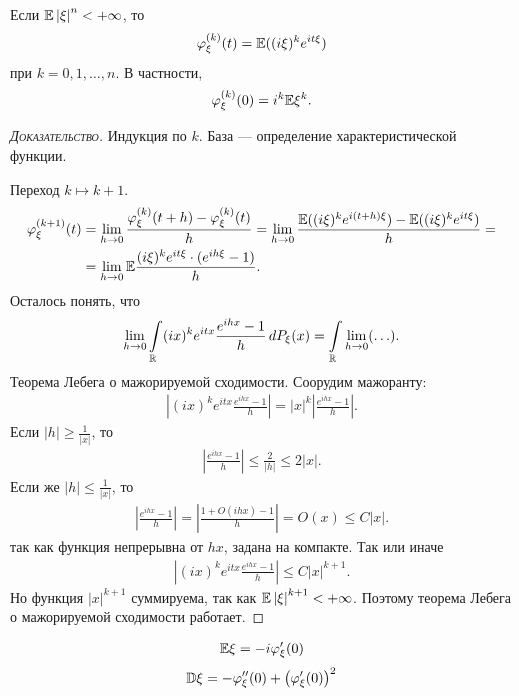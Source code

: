 \documentclass[../main.tex]{subfiles}
\begin{document}
\begin{thm}
 Если $ \mathbb E \left| \xi \right|^{n} < +\infty $, то
 \begin{align*}
  \varphi_\xi^{(k)}(t) = \mathbb E((i\xi)^{k}e^{it\xi})
 \end{align*} при $ k = 0, 1, \ldots, n $. В частности,
 \begin{align*}
  \varphi_\xi^{(k)}(0) = i^{k} \mathbb E\xi^{k}.
 \end{align*}
\end{thm}
\begin{proof}[\normalfont\textsc{Доказательство}]
 Индукция по $ k $. База --- определение характеристической функции.

 Переход $ k \mapsto k + 1 $.
 \begin{align*}
  \varphi_\xi^{(k+1)}(t) &= \lim_{h \to 0} \frac{\varphi_\xi^{(k)}(t+h) - \varphi_\xi^{(k)}(t)}{h} = \lim_{h \to 0} \frac{\mathbb E((i\xi)^{k}e^{i(t+h)\xi}) - \mathbb E((i\xi)^{k}e^{it\xi})}{h} = \\
  &= \lim_{h \to 0} \mathbb E \frac{(i\xi)^{k}e^{it\xi} \cdot (e^{ih\xi} - 1)}{h}.
 \end{align*} Осталось понять, что
 \begin{align*}
  \lim_{h \to 0} \int\limits_{\mathbb{R}} (ix)^{k}e^{itx} \frac{e^{ihx} - 1}{h}\,dP_\xi(x) = \int\limits_{\mathbb{R}} \lim_{h \to 0} (\ldots).
 \end{align*} Теорема Лебега о мажорируемой сходимости. Соорудим мажоранту:
 \begin{align*}
  \left| (ix)^{k}e^{itx}\frac{e^{ihx}-1}{h} \right| = \left| x \right|^{k} \left| \frac{e^{ihx}-1}{h} \right|.
 \end{align*} Если $ \left| h \right| \geqslant \frac{1}{\left| x \right|} $, то
 \begin{align*}
  \left| \frac{e^{ihx}-1}{h} \right| \leqslant \frac{2}{\left| h \right|} \leqslant 2 \left| x \right|.
 \end{align*} Если же $ \left| h \right| \leqslant \frac{1}{\left| x \right|} $, то
 \begin{align*}
	 \left| \frac{e^{ihx}-1}{h} \right| = \left| \frac{1 + O(ihx) - 1}{h} \right| = O(x) \leqslant C \left| x \right|.
 \end{align*} так как функция непрерывна от $ hx $, задана на компакте. Так или иначе
 \begin{align*}
  \left| (ix)^{k}e^{itx}\frac{e^{ihx}-1}{h} \right| \leqslant C \left| x \right|^{k+1}. 
 \end{align*} Но функция $ \left| x \right|^{k+1} $ суммируема, так как $ \mathbb E \left| \xi \right|^{k+1}  < +\infty$. Поэтому теорема Лебега о мажорируемой сходимости работает.
\end{proof}
\begin{crly}
 \begin{align*}
  \mathbb E\xi = -i \varphi'_\xi(0)
 \end{align*}
 \begin{align*}
  \mathbb D\xi = -\varphi''_\xi(0) + \left( \varphi'_\xi(0) \right)^{2}
 \end{align*}
\end{crly}
\end{document}
